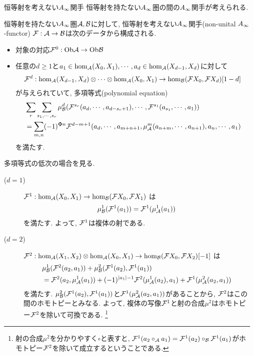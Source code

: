 \documentclass[aspectratio=169, dvipdfmx, 8pt, notheorems, uplatex]{beamer}
\begin{document}
\begin{frame}{恒等射を考えない$A_\infty$関手}
  恒等射を持たない$A_\infty$圏の間の$A_\infty$関手が考えられる. 

  \begin{definition}
    恒等射を持たない$A_\infty$圏$\mathcal{A}, \mathcal{B}$に対して, 恒等射を考えない$A_\infty$関手(non-unital $A_\infty$-functor) $\mathcal{F} : \mathcal{A} \to \mathcal{B}$は次のデータから構成される. 
    \begin{itemize}
      \item 対象の対応$\mathcal{F}^0 : \mathrm{Ob}\mathcal{A} \to \mathrm{Ob}\mathcal{B}$
      \item 任意の$d \geq 1$と$a_1 \in \hom_{\mathcal{A}}(X_0,X_1), \cdots, a_d \in \hom_{\mathcal{A}}(X_{d-1},X_d)$に対して
      \begin{align*}
        \mathcal{F}^d : \hom_{\mathcal{A}}(X_{d-1},X_d) \otimes \cdots \otimes \hom_{\mathcal{A}}(X_0,X_1) \to \hom_{\mathcal{B}}(\mathcal{F} X_0,\mathcal{F} X_d)[1-d]
      \end{align*}
      が与えられていて, 多項等式(polynomial equation)
      \begin{align*}
        &\sum_r \sum_{s_1,\cdots,s_r} \mu^d_\B (\F^{s_r} (a_d,\cdots,a_{d-s_r+1}), \cdots, \F^{s_1}(a_{s_1},\cdots,a_1)) \\ 
        &= \sum_{m,n} (-1)^{\maltese n} \F^{d-m+1} (a_d,\cdots,a_{m+n+1}, \mu^m_\A(a_{n+m},\cdots,a_{n+1}), a_n,\cdots,a_1)
      \end{align*}
      を満たす. 
    \end{itemize}
  \end{definition}    
\end{frame}

\begin{frame}
  多項等式の低次の場合を見る. 

  \begin{remark}
    \begin{description}
      \item[($d=1$)] $\mathcal{F}^1 : \hom_{\mathcal{A}}(X_0,X_1) \to \hom_{\mathcal{B}}(\mathcal{F} X_0,\mathcal{F} X_1)$ は
      \begin{align*}
        \mu^1_{\mathcal{B}}(\mathcal{F}^1(a_1)) = \mathcal{F}^1(\mu^1_{\mathcal{A}}(a_1))
      \end{align*}
      を満たす. 
      よって, $\mathcal{F}^1$は複体の射である.
      \item[($d=2$)] $\mathcal{F}^2 : \hom_{\mathcal{A}}(X_1,X_2) \otimes \hom_{\mathcal{A}}(X_0,X_1) \to \hom_{\mathcal{B}}(\mathcal{F} X_0,\mathcal{F} X_2)[-1]$ は
      \begin{align*}
        &\mu^1_{\mathcal{B}}(\mathcal{F}^2(a_2,a_1)) + \mu^2_{\mathcal{B}}(\mathcal{F}^1(a_2), \mathcal{F}^1(a_1)) \\
        &= \mathcal{F}^2(a_2,\mu^1_{\mathcal{A}}(a_1)) + (-1)^{|a_1|-1} \mathcal{F}^2(\mu^1_{\mathcal{A}}(a_2),a_1) + \mathcal{F}^1(\mu^2_{\mathcal{A}}(a_2,a_1))
      \end{align*}
      を満たす. 
      $\mu^2_{\mathcal{B}}(\mathcal{F}^1(a_2), \mathcal{F}^1(a_1)) $と$\mathcal{F}^1(\mu^2_{\mathcal{A}}(a_2,a_1))$があることから, $\mathcal{F}^2$はこの間のホモトピーとみなる. 
      よって, 複体の写像$\mathcal{F}^1$と射の合成$\mu^2$はホモトピー$\mathcal{F}^2$を除いて可換である.
      \footnote{
        射の合成$\mu^2$を分かりやすく$\circ$と表すと, $\mathcal{F}^1(a_2 \circ_{\mathcal{A}} a_1)=\mathcal{F}^1(a_2) \circ_{\mathcal{B}} \mathcal{F}^1(a_1)$がホモトピー$\mathcal{F}^2$を除いて成立するということである. 
      }
    \end{description}
  \end{remark}
\end{frame}
\end{document}
